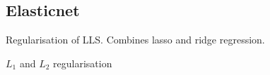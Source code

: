 
\subsection{Elasticnet}

Regularisation of LLS. Combines lasso and ridge regression.

\(L_1\) and \(L_2\) regularisation

